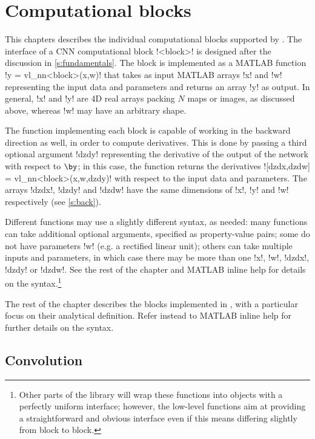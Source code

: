\chapter{Computational blocks}\label{s:blocks}

This chapters describes the individual computational blocks supported by \matconvnet. The interface of a CNN computational block !<block>! is designed after the discussion in \cref{s:fundamentals}. The block is implemented as a MATLAB function !y = vl_nn<block>(x,w)! that takes as input MATLAB arrays !x! and !w! representing the input data and parameters and returns an array !y! as output. In general, !x! and !y! are 4D real arrays packing $N$ maps or images, as discussed above, whereas !w! may have an arbitrary shape.

The function implementing each block is capable of working in the backward direction as well, in order to compute derivatives. This is done by passing a third optional argument !dzdy! representing the derivative of the output of the network with respect to $\by$; in this case, the function returns the derivatives ![dzdx,dzdw] = vl_nn<block>(x,w,dzdy)! with respect to the input data and parameters. The arrays !dzdx!, !dzdy! and !dzdw! have the same dimensions of !x!, !y! and !w! respectively (see \cref{s:back}).

Different functions may use a slightly different syntax, as needed: many functions can take additional optional arguments, specified as property-value pairs; some do not have parameters  !w! (e.g. a rectified linear unit); others can take multiple inputs and parameters, in which case there may be more than one !x!, !w!, !dzdx!, !dzdy! or !dzdw!. See the rest of the chapter and MATLAB inline help for details on the syntax.\footnote{Other parts of the library will wrap these functions into objects with a perfectly uniform interface; however, the low-level functions aim at providing a straightforward and obvious interface even if this means differing slightly from block to block.}

The rest of the chapter describes the blocks implemented in \matconvnet, with a particular focus on their analytical definition. Refer instead to MATLAB inline help for further details on the syntax.

\section{Convolution}\label{s:convolution}

